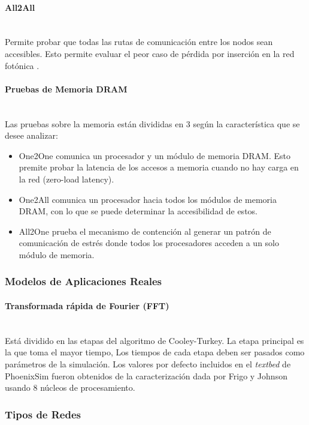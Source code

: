 \paragraph{All2All}~\\ 
Permite probar que todas las rutas de comunicación entre los nodos sean accesibles. Esto permite evaluar el peor caso de pérdida por inserción en la red fotónica \cite{Manual}.

\paragraph{Pruebas de Memoria DRAM}~\\
Las pruebas sobre la memoria están divididas en 3 según la característica que se desee analizar: 
\begin{itemize}
\item One2One comunica un procesador y un módulo de memoria DRAM. Esto premite probar la latencia de los accesos a memoria cuando no hay carga en la red (zero-load latency).
\item One2All comunica un procesador hacia todos los módulos de memoria DRAM, con lo que se puede determinar la accesibilidad de estos.
\item All2One prueba el mecanismo de contención al generar un patrón de comunicación de estrés donde todos los procesadores acceden a un solo módulo de memoria.
\end{itemize} 

\subsubsection{Modelos de Aplicaciones Reales}
\paragraph{Transformada rápida de Fourier (FFT)}~\\

Está dividido en las etapas del algoritmo de Cooley-Turkey. La etapa principal es la que toma el mayor tiempo, 
Los tiempos de cada etapa deben ser pasados como parámetros de la simulación. Los valores por defecto incluidos en el \textit{textbed} de PhoenixSim fueron obtenidos de la caracterización  dada por Frigo y Johnson \cite{benchFFT} usando 8 núcleos de procesamiento. 

\subsubsection{Tipos de Redes}

